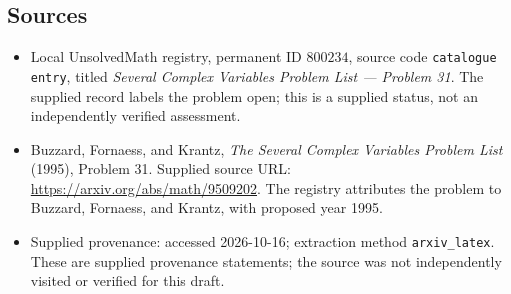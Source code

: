 \documentclass[11pt]{article}
\begin{document}
\subsection{Sources}
\begin{itemize}
\item Local UnsolvedMath registry, permanent ID \(800234\), source code \texttt{catalogue entry}, titled \emph{Several Complex Variables Problem List --- Problem 31}. The supplied record labels the problem open; this is a supplied status, not an independently verified assessment.
\item Buzzard, Fornaess, and Krantz, \emph{The Several Complex Variables Problem List} (1995), Problem 31. Supplied source URL: \url{https://arxiv.org/abs/math/9509202}. The registry attributes the problem to Buzzard, Fornaess, and Krantz, with proposed year 1995.
\item Supplied provenance: accessed 2026-10-16; extraction method \texttt{arxiv\_latex}. These are supplied provenance statements; the source was not independently visited or verified for this draft.
\end{itemize}
\end{document}
